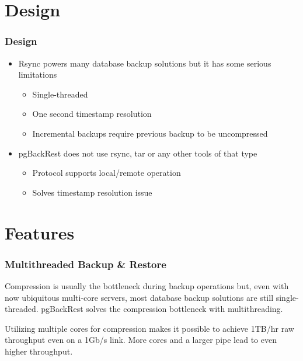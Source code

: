 \documentclass[hyperref={pdfpagelabels=false}]{beamer}
\begin{document}
    \section{Design}

    \begin{frame}
        \frametitle{Design}

        \begin{itemize}
            \item Rsync powers many database backup solutions but it has some serious limitations

            \begin{itemize}
                \item Single-threaded
                \item One second timestamp resolution
                \item Incremental backups require previous backup to be uncompressed
            \end{itemize}

            \item pgBackRest does not use rsync, tar or any other tools of that type

            \begin{itemize}
                \item Protocol supports local/remote operation
                \item Solves timestamp resolution issue
            \end{itemize}
        \end{itemize}
    \end{frame}

    \section{Features}

    \begin{frame}
        \frametitle{Multithreaded Backup \& Restore}

        Compression is usually the bottleneck during backup operations but, even with now ubiquitous multi-core servers, most database backup solutions are still single-threaded. pgBackRest solves the compression bottleneck with multithreading.
        \par
        Utilizing multiple cores for compression makes it possible to achieve 1TB/hr raw throughput even on a 1Gb/s link. More cores and a larger pipe lead to even higher throughput.
    \end{frame}
\end{document}
